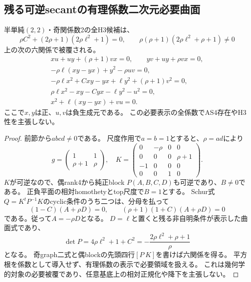 \subsection{残る可逆secantの有理係数二次元必要曲面}
\label{subsec:h3-order2-22-secant-open}
\begin{proposition}\label{prop:h3-order2-22-secant-open-normalform}
半単純$(2,2)$・奇関係数2の全H3候補は、
\[
 \rho C^2+(2\rho+1)(2\rho\ell^2+1)=0,\qquad
 \rho(\rho+1)(2\rho\ell^2+\rho+1)\ne0
\]
上の次の六関係で被覆される。
\begin{gather*}
 xu+uy+(\rho+1)vx=0,\qquad yv+uy+\rho vx=0,\\
 -\rho\ell(xy-yx)+y^2-\rho uv=0,\\
 -\rho\ell x^2+Cxy-yx+\ell y^2+(\rho+1)v^2=0,\\
 \rho\ell x^2-xy-Cyx-\ell y^2-u^2=0,\\
 x^2+\ell(xy-yx)+vu=0.
\end{gather*}
ここで$x,y$は正、$u,v$は負生成元である。
この必要表示の全係数でAS4存在やH3性を主張しない。
\end{proposition}
\begin{proof}
前節から$abcd\ne0$である。
尺度作用で$a=b=1$とすると、$\rho=ad$により
\[
 g=\begin{pmatrix}1&1\\\rho+1&\rho\end{pmatrix},\quad
 K=\begin{pmatrix}0&-\rho&0&0\\0&0&0&\rho+1\\-1&0&0&0\\0&0&1&0\end{pmatrix}.
\]
$K$が可逆なので、偶rank4から純正block $P(A,B,C,D)$も可逆であり、$B\ne0$である。
正負平面の相対homothetyとtop尺度で$B=1$とする。
Schur式$Q=K^tP^{-1}K$のcyclic条件のうち二つは、分母を払って
\[
 (1-C)(A+\rho D)=0,\qquad
 (\rho+1)(1+C)(A+\rho D)=0
\]
である。従って$A=-\rho D$となる。
$D=\ell$と置くと残る非自明条件が表示した曲面式であり、
\[
 \det P=4\rho\ell^2+1+C^2
       =-\frac{2\rho\ell^2+\rho+1}{\rho}
\]
となる。
奇graph二式と偶blockの先頭四行$[P\ K]$を書けば六関係を得る。
平方根を係数として導入せず、有理係数の表示で必要領域を扱える。
これは幾何学的対象の必要被覆であり、任意基底上の相対正規化や降下を主張しない。
\end{proof}

